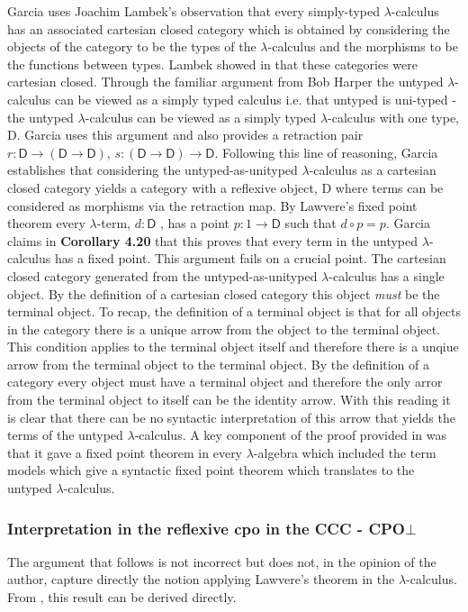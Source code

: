Garcia uses Joachim Lambek's observation that every simply-typed
$\lambda$-calculus has an associated cartesian closed category which is obtained
by considering the objects of the category to be the types of the
$\lambda$-calculus and the morphisms to be the functions between types. Lambek
showed in  that these categories were cartesian closed. Through the
familiar argument from  Bob Harper the untyped $\lambda$-calculus can
be viewed as a simply typed calculus i.e.  that untyped is uni-typed - the
untyped $\lambda$-calculus can be viewed as a simply typed $\lambda$-calculus
with one type, \textsf{D}. Garcia uses this argument and also provides a
retraction pair $r : \textsf{D} \rightarrow (\textsf{D} \rightarrow
\textsf{D})$, $s : (\textsf{D} \rightarrow \textsf{D}) \rightarrow \textsf{D}$.
Following this line of reasoning, Garcia establishes that considering the
untyped-as-unityped $\lambda$-calculus as a cartesian closed category yields a
category with a reflexive object, \textsf{D} where terms can be considered as
morphisms via the retraction map. By Lawvere's fixed point theorem every
$\lambda$-term, $d : \textsf{D}$ , has a point $p: 1 \rightarrow \textsf{D}$
such that $d \circ p = p$. Garcia claims in \textbf{Corollary 4.20} that this
proves that every term in the untyped $\lambda$-calculus has a fixed point. This
argument fails on a crucial point. The cartesian closed category generated from
the untyped-as-unityped $\lambda$-calculus has a single object. By the
definition of a cartesian closed category this object \textit{must} be the
terminal object. To recap, the definition of a terminal object is that for all
objects in the category there is a unique arrow from the object to the terminal
object. This condition applies to the terminal object itself and therefore there
is a unqiue arrow from the terminal object to the terminal object. By the
definition of a category every object must have a terminal object and therefore
the only arror from the terminal object to itself can be the identity arrow.
With this reading it is clear that there can be no syntactic interpretation of
this arrow that yields the terms of the untyped $\lambda$-calculus. A key
component of the proof provided in  was that it gave a fixed point
theorem in every $\lambda$-algebra which included the term models which give a
syntactic fixed point theorem which translates to the untyped
$\lambda$-calculus.

\subsubsection{Interpretation in the reflexive cpo in the CCC -
\textbf{CPO}$\bot$}
The argument that follows is not incorrect but does not, in the opinion of the
author, capture directly the notion applying Lawvere's theorem in the
$\lambda$-calculus. From , this result can be derived directly.


